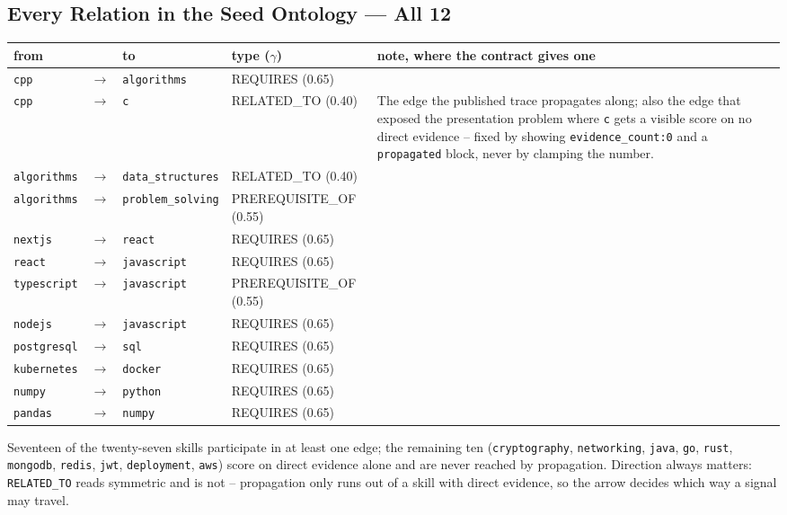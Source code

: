 \documentclass[10pt,a4paper]{article}
\begin{document}
\subsection{Every Relation in the Seed Ontology --- All 12}

\begin{center}
\small
\begin{tabular}{@{}lcll L{5.0cm}@{}}
\toprule
\textbf{from} & & \textbf{to} & \textbf{type ($\gamma$)} & \textbf{note, where the contract gives one} \\
\midrule
\texttt{cpp}        & $\to$ & \texttt{algorithms}      & REQUIRES (0.65) & \\
\texttt{cpp}        & $\to$ & \texttt{c}                & RELATED\_TO (0.40) & The edge the published trace propagates along; also the edge that exposed the presentation problem where \texttt{c} gets a visible score on no direct evidence -- fixed by showing \texttt{evidence\_count:0} and a \texttt{propagated} block, never by clamping the number. \\
\texttt{algorithms} & $\to$ & \texttt{data\_structures} & RELATED\_TO (0.40) & \\
\texttt{algorithms} & $\to$ & \texttt{problem\_solving} & PREREQUISITE\_OF (0.55) & \\
\texttt{nextjs}     & $\to$ & \texttt{react}            & REQUIRES (0.65) & \\
\texttt{react}      & $\to$ & \texttt{javascript}       & REQUIRES (0.65) & \\
\texttt{typescript} & $\to$ & \texttt{javascript}       & PREREQUISITE\_OF (0.55) & \\
\texttt{nodejs}     & $\to$ & \texttt{javascript}       & REQUIRES (0.65) & \\
\texttt{postgresql} & $\to$ & \texttt{sql}              & REQUIRES (0.65) & \\
\texttt{kubernetes} & $\to$ & \texttt{docker}           & REQUIRES (0.65) & \\
\texttt{numpy}      & $\to$ & \texttt{python}           & REQUIRES (0.65) & \\
\texttt{pandas}     & $\to$ & \texttt{numpy}            & REQUIRES (0.65) & \\
\bottomrule
\end{tabular}
\end{center}

Seventeen of the twenty-seven skills participate in at least one edge; the
remaining ten (\texttt{cryptography}, \texttt{networking}, \texttt{java},
\texttt{go}, \texttt{rust}, \texttt{mongodb}, \texttt{redis}, \texttt{jwt},
\texttt{deployment}, \texttt{aws}) score on direct evidence alone and are
never reached by propagation. Direction always matters: \texttt{RELATED\_TO}
reads symmetric and is not -- propagation only runs out of a skill with
direct evidence, so the arrow decides which way a signal may travel.
\end{document}
